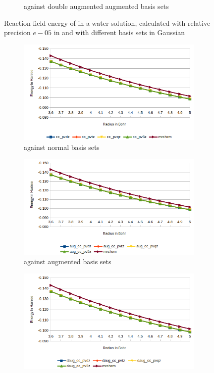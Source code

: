 \documentclass[../master_thesis.tex]{subfiles}
\begin{document}
\begin{figure}[hb!]
\begin{subfigure}[b]{0.75\linewidth}
    \caption{\mrchem against double augmented augmented basis sets}
  \end{subfigure}
  \caption[Reaction field energy of ]{Reaction field energy of  in a water solution, calculated with relative precision $e-05$ in \mrchem
  and with different basis sets in Gaussian}
  \label{fig:watEnergyplots}
\end{figure}

\begin{figure}[h!]
  \centering
  \begin{subfigure}[b]{0.75\linewidth}
    \includegraphics[width=\linewidth]{img/Erlip.png}
    \caption{\mrchem against normal basis sets}
  \end{subfigure}
  \begin{subfigure}[b]{0.75\linewidth}
    \includegraphics[width=\linewidth]{img/Erauglip.png}
    \caption{\mrchem against augmented basis sets}
  \end{subfigure}
  \begin{subfigure}[b]{0.75\linewidth}
    \includegraphics[width=\linewidth]{img/Erdauglip.png}

\end{subfigure}
\end{figure}
\end{document}
